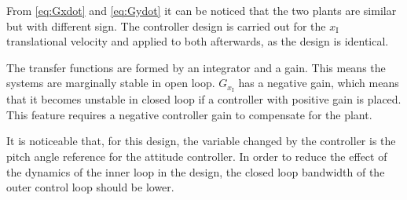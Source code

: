 From \autoref{eq:Gxdot} and \ref{eq:Gydot} it can be noticed that the two plants are similar but with different sign. The controller design is carried out for the $x_{\mathrm{I}}$ translational velocity and applied to both afterwards, as the design is identical.

The transfer functions are formed by an integrator and a gain. This means the systems are marginally stable in open loop. $G_{x_{\mathrm{I}}}$ has a negative gain, which means that it becomes unstable in closed loop if a controller with positive gain is placed. This feature requires a negative controller gain to compensate for the plant.

It is noticeable that, for this design, the variable changed by the controller is the pitch angle reference for the attitude controller. In order to reduce the effect of the dynamics of the inner loop in the design, the closed loop bandwidth of the outer control loop should be lower.

